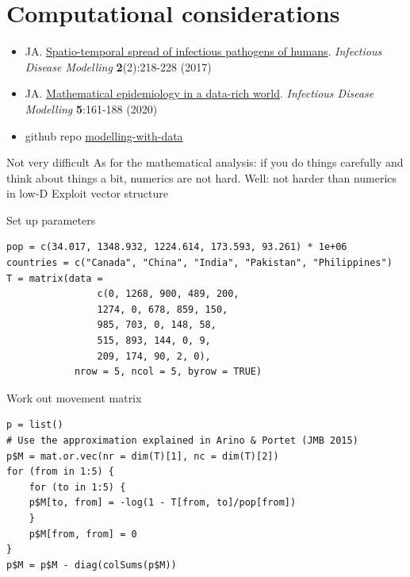 \documentclass[aspectratio=43]{beamer}
\begin{document}




\section{Computational considerations}

\begin{frame}
	\begin{itemize}
		\item JA. \href{https://doi.org/10.1016/j.idm.2017.05.001}{Spatio-temporal spread of infectious pathogens of humans}. \emph{Infectious Disease Modelling} \textbf{2}(2):218-228 (2017)
		\item JA. \href{https://doi.org/10.1016/j.idm.2019.12.008}{Mathematical epidemiology in a data-rich world}. \emph{Infectious Disease Modelling} \textbf{5}:161-188 (2020)
		\item github repo \href{https://github.com/julien-arino/modelling-with-data}{modelling-with-data}
	\end{itemize}
\end{frame}

\begin{frame}{Not very difficult}
As for the mathematical analysis: if you do things carefully and think about things a bit, numerics are not hard. Well: not harder than numerics in low-D
\vfill
Exploit vector structure
\end{frame}

\begin{frame}[fragile]{Set up parameters}
\begin{lstlisting}
pop = c(34.017, 1348.932, 1224.614, 173.593, 93.261) * 1e+06
countries = c("Canada", "China", "India", "Pakistan", "Philippines")
T = matrix(data = 
				c(0, 1268, 900, 489, 200, 
				1274, 0, 678, 859, 150, 
				985, 703, 0, 148, 58, 
				515, 893, 144, 0, 9, 
				209, 174, 90, 2, 0), 
			nrow = 5, ncol = 5, byrow = TRUE)	
\end{lstlisting}
\end{frame}

\begin{frame}[fragile]{Work out movement matrix}
\begin{lstlisting}
p = list()
# Use the approximation explained in Arino & Portet (JMB 2015)
p$M = mat.or.vec(nr = dim(T)[1], nc = dim(T)[2])
for (from in 1:5) {
	for (to in 1:5) {
	p$M[to, from] = -log(1 - T[from, to]/pop[from])
	}
	p$M[from, from] = 0
}
p$M = p$M - diag(colSums(p$M))
\end{lstlisting}	
\end{frame}
\end{document}
